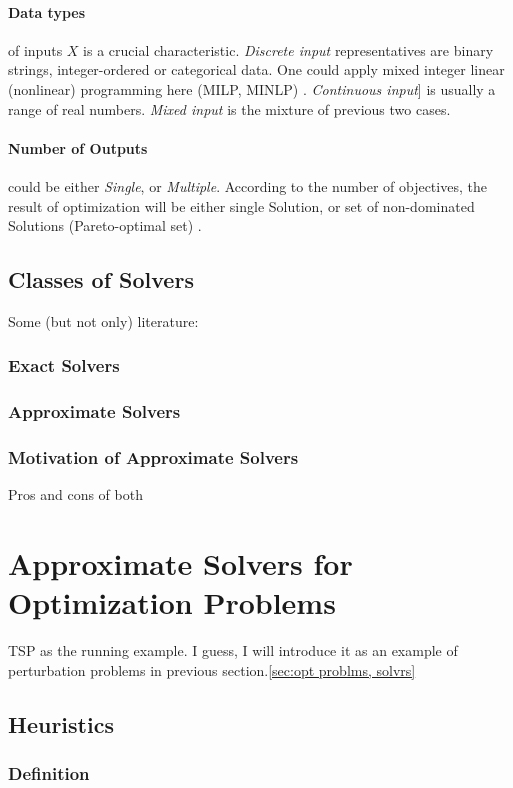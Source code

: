 \paragraph{Data types} of inputs $X$ is a crucial characteristic. \textit{Discrete input} representatives are binary strings, integer-ordered or categorical data. One could apply mixed integer linear (nonlinear) programming here (MILP, MINLP) \cite{biegler2004retrospective}. \textit{Continuous input}] is usually a range of real numbers. \textit{Mixed input} is the mixture of previous two cases.


\paragraph{Number of Outputs} could be either \textit{Single}, or \textit{Multiple}. According to the number of objectives, the result of optimization will be either single Solution, or set of non-dominated Solutions (Pareto-optimal set) \cite{deb2014multi}.


\subsection{Classes of Solvers}
Some (but not only) literature: \cite{bergstra2011algorithms}
\subsubsection{Exact Solvers}
\subsubsection{Approximate Solvers}
\subsubsection{Motivation of Approximate Solvers}
Pros and cons of both \cite{hromkovivc2013algorithmics}


\section{Approximate Solvers for Optimization Problems}
TSP as the running example. I guess, I will introduce it as an example of perturbation problems in previous section.\ref{sec:opt problms, solvrs}

\subsection{Heuristics}
\subsubsection{Definition}
